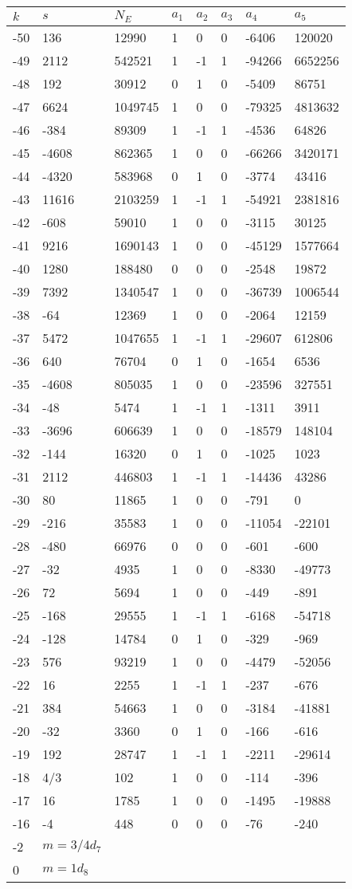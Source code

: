 \documentclass{amsart}
\begin{document}
\begin{longtable}{|l|l|l|lllll|}
\hline
$k$ & $s$ & $N_E$ & $a_1$ & $a_2$ & $a_3$ & $a_4$ & $a_5$\\
\hline
-50&136&12990&1&0&0&-6406&120020\\
-49&2112&542521&1&-1&1&-94266&6652256\\
-48&192&30912&0&1&0&-5409&86751\\
-47&6624&1049745&1&0&0&-79325&4813632\\
-46&-384&89309&1&-1&1&-4536&64826\\
-45&-4608&862365&1&0&0&-66266&3420171\\
-44&-4320&583968&0&1&0&-3774&43416\\
-43&11616&2103259&1&-1&1&-54921&2381816\\
-42&-608&59010&1&0&0&-3115&30125\\
-41&9216&1690143&1&0&0&-45129&1577664\\
-40&1280&188480&0&0&0&-2548&19872\\
-39&7392&1340547&1&0&0&-36739&1006544\\
-38&-64&12369&1&0&0&-2064&12159\\
-37&5472&1047655&1&-1&1&-29607&612806\\
-36&640&76704&0&1&0&-1654&6536\\
-35&-4608&805035&1&0&0&-23596&327551\\
-34&-48&5474&1&-1&1&-1311&3911\\
-33&-3696&606639&1&0&0&-18579&148104\\
-32&-144&16320&0&1&0&-1025&1023\\
-31&2112&446803&1&-1&1&-14436&43286\\
-30&80&11865&1&0&0&-791&0\\
-29&-216&35583&1&0&0&-11054&-22101\\
-28&-480&66976&0&0&0&-601&-600\\
-27&-32&4935&1&0&0&-8330&-49773\\
-26&72&5694&1&0&0&-449&-891\\
-25&-168&29555&1&-1&1&-6168&-54718\\
-24&-128&14784&0&1&0&-329&-969\\
-23&576&93219&1&0&0&-4479&-52056\\
-22&16&2255&1&-1&1&-237&-676\\
-21&384&54663&1&0&0&-3184&-41881\\
-20&-32&3360&0&1&0&-166&-616\\
-19&192&28747&1&-1&1&-2211&-29614\\
-18&4/3&102&1&0&0&-114&-396\\
-17&16&1785&1&0&0&-1495&-19888\\
-16&-4&448&0&0&0&-76&-240\\
-2&$m=3/4d_{7}$&&\multicolumn{5}{c|}{}\\
0&$m=1d_{8}$&&\multicolumn{5}{c|}{}\\
\hline
\end{longtable}
\end{document}
